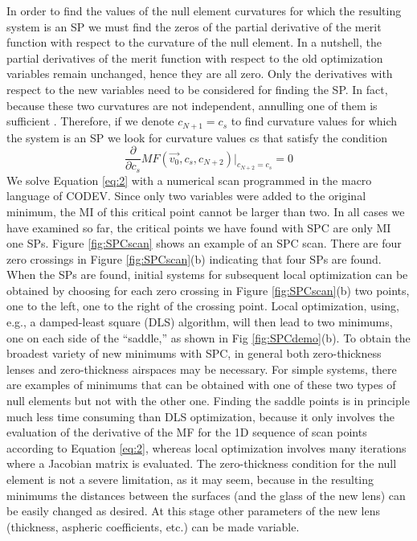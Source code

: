 In order to find the values of the null element curvatures for which the resulting system is an SP we must find the zeros of the partial derivative of the merit function with respect to the curvature of the null element. In a nutshell, the partial derivatives of the merit function with respect to the old optimization variables remain unchanged, hence they are all zero. Only the derivatives with respect to the new variables need to be considered
for finding the SP. In fact, because these two curvatures are not independent, annulling one of them is sufficient \cite{MVTurnhoutSPC15}. Therefore, if we denote $c_{N+1} = c_s$ to find curvature values for which the system is an SP we look for curvature values cs that satisfy the condition
\begin{equation} \label{eq:2}
    \frac{\partial}{\partial{c_s}} MF(\vec{v_0},c_s,c_{N+2}) \rvert_{c_{N+2}=c_s} = 0
\end{equation}
We solve Equation \ref{eq:2} with a numerical scan programmed in the macro language of CODEV. Since only two variables were added to the original minimum, the MI of this critical point cannot be larger than two. In all cases we have examined so far, the critical points we have found with SPC are only MI one SPs. Figure \ref{fig:SPCscan} shows an example of an SPC scan. There are four zero crossings in Figure \ref{fig:SPCscan}(b) indicating that four SPs are found. When the SPs are found, initial systems for subsequent local optimization can be obtained by choosing for each zero crossing in Figure \ref{fig:SPCscan}(b) two points, one to the left, one to the right of the crossing point. Local optimization, using, e.g., a damped-least square (DLS) algorithm, will then lead to two minimums, one on each side of the “saddle,” as shown in Fig \ref{fig:SPCdemo}(b). To obtain the broadest variety of new minimums with SPC, in general both zero-thickness lenses and zero-thickness airspaces may be necessary. For simple systems, there are examples of minimums that can be obtained with one of these two types of null elements but not with the other one. Finding the saddle points is in principle much less time consuming than DLS optimization, because it only involves the evaluation of the derivative of the MF for the 1D sequence of scan points according to Equation \ref{eq:2}, whereas local optimization involves many iterations where a Jacobian matrix is evaluated. The zero-thickness condition for the null element is not a severe limitation, as it may seem, because in the resulting minimums the distances between the surfaces (and the glass of the new lens) can be easily changed as desired. At this stage other parameters of the new lens (thickness, aspheric coefficients, etc.) can be made variable.

